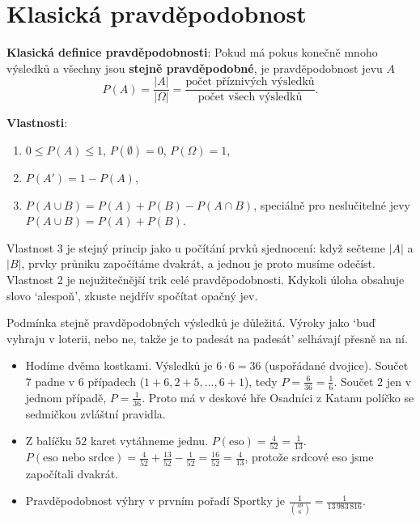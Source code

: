 \section{Klasická pravděpodobnost}\label{sec:klasicka-pravdepodobnost}

\begin{definitionbox}
  \textbf{Klasická definice pravděpodobnosti}: Pokud má pokus konečně mnoho výsledků a všechny jsou \textbf{stejně pravděpodobné}, je pravděpodobnost jevu $A$
  \begin{equation*}
    P(A) = \frac{|A|}{|\Omega|} = \frac{\text{počet příznivých výsledků}}{\text{počet všech výsledků}}.
  \end{equation*}

  \textbf{Vlastnosti}:
  \begin{enumerate}
    \item $0\leq P(A)\leq 1$, $P(\emptyset) = 0$, $P(\Omega) = 1$,
    \item $P(A') = 1 - P(A)$,
    \item $P(A\cup B) = P(A) + P(B) - P(A\cap B)$, speciálně pro neslučitelné jevy $P(A\cup B) = P(A) + P(B)$.
  \end{enumerate}
\end{definitionbox}

Vlastnost 3 je stejný princip jako u počítání prvků sjednocení: když sečteme $|A|$ a $|B|$, prvky průniku započítáme dvakrát, a jednou je proto musíme odečíst. Vlastnost 2 je nejužitečnější trik celé pravděpodobnosti. Kdykoli úloha obsahuje slovo `alespoň', zkuste nejdřív spočítat opačný jev.

Podmínka stejně pravděpodobných výsledků je důležitá. Výroky jako `buď vyhraju v loterii, nebo ne, takže je to padesát na padesát' selhávají přesně na ní.

\begin{example}
  \begin{itemize}
    \item Hodíme dvěma kostkami. Výsledků je $6\cdot 6 = 36$ (uspořádané dvojice). Součet $7$ padne v $6$ případech ($1 + 6, 2 + 5, \ldots, 6 + 1$), tedy $P = \frac{6}{36} = \frac{1}{6}$. Součet $2$ jen v jednom případě, $P = \frac{1}{36}$. Proto má v deskové hře Osadníci z Katanu políčko se sedmičkou zvláštní pravidla.
    \item Z balíčku $52$ karet vytáhneme jednu. $P(\text{eso}) = \frac{4}{52} = \frac{1}{13}$. $P(\text{eso nebo srdce}) = \frac{4}{52} + \frac{13}{52} - \frac{1}{52} = \frac{16}{52} = \frac{4}{13}$, protože srdcové eso jsme započítali dvakrát.
    \item Pravděpodobnost výhry v prvním pořadí Sportky je $\frac{1}{\binom{49}{6}} = \frac{1}{13\,983\,816}$.
  \end{itemize}
\end{example}

